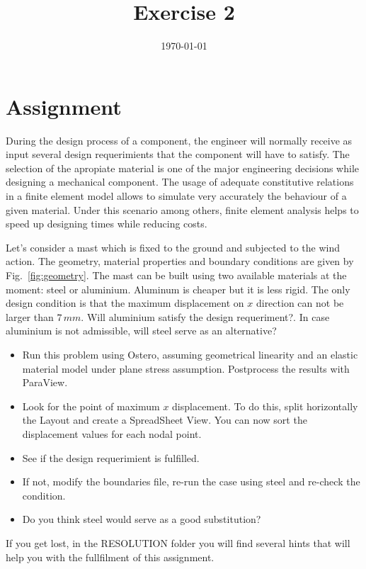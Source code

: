 \documentclass[12pt]{article}
\title{Exercise 2}
\date{\today}
\begin{document}
\maketitle

\section{Assignment}
During the design process of a component, the engineer will normally receive as input several design requerimients that the component will have to satisfy. The selection of the apropiate material is one of the major engineering decisions while designing a mechanical component. The usage of adequate constitutive relations in a finite element model allows to simulate very accurately the behaviour of a given material. Under this scenario among others, finite element analysis helps to speed up designing times while reducing costs. 

\medskip

Let's consider a mast which is fixed to the ground and subjected to the wind action. The geometry, material properties and boundary conditions are given by Fig.~\ref{fig:geometry}. The mast can be built using two available materials at the moment: steel or aluminium. Aluminum is cheaper but it is less rigid. The only design condition is that the maximum displacement on $x$ direction can not be larger than $7\,mm$. Will aluminium satisfy the design requeriment?. In case aluminium is not admissible, will steel serve as an alternative?

\begin{itemize}
\item Run this problem using Ostero, assuming geometrical linearity and an elastic material model under plane stress assumption. Postprocess the results with ParaView.
\item Look for the point of maximum $x$ displacement. To do this, split horizontally the Layout and create a SpreadSheet View. You can now sort the displacement values for each nodal point.
\item See if the design requerimient is fulfilled.
\item If not, modify the boundaries file, re-run the case using steel and re-check the condition.
\item Do you think steel would serve as a good substitution?
\end{itemize}

If you get lost, in the RESOLUTION folder you will find several hints that will help you with the fullfilment of this assignment.
\end{document}
